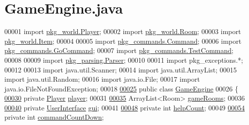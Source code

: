\hypertarget{GameEngine_8java_source}{\section{Game\-Engine.\-java}
}

\begin{DoxyCode}
00001 \textcolor{keyword}{import} \hyperlink{classpkg__world_1_1Player}{pkg\_world.Player};
00002 \textcolor{keyword}{import} \hyperlink{classpkg__world_1_1Room}{pkg\_world.Room};
00003 \textcolor{keyword}{import} \hyperlink{classpkg__world_1_1Item}{pkg\_world.Item};
00004 
00005 \textcolor{keyword}{import} \hyperlink{classpkg__commands_1_1Command}{pkg\_commands.Command};
00006 \textcolor{keyword}{import} \hyperlink{classpkg__commands_1_1GoCommand}{pkg\_commands.GoCommand};
00007 \textcolor{keyword}{import} \hyperlink{classpkg__commands_1_1TestCommand}{pkg\_commands.TestCommand};
00008 
00009 \textcolor{keyword}{import} \hyperlink{classpkg__parsing_1_1Parser}{pkg\_parsing.Parser};
00010 
00011 \textcolor{keyword}{import} pkg\_exceptions.*;
00012 
00013 \textcolor{keyword}{import} java.util.Scanner;
00014 \textcolor{keyword}{import} java.util.ArrayList;
00015 \textcolor{keyword}{import} java.util.Random;
00016 \textcolor{keyword}{import} java.io.File;
00017 \textcolor{keyword}{import} java.io.FileNotFoundException;
00018 
\hypertarget{GameEngine_8java_source_l00025}{}\hyperlink{classGameEngine}{00025} \textcolor{keyword}{public} \textcolor{keyword}{class }\hyperlink{classGameEngine}{GameEngine}
00026 \{
\hypertarget{GameEngine_8java_source_l00030}{}\hyperlink{classGameEngine_a4666c6719428cc43014b30b305eeef5d}{00030}     \textcolor{keyword}{private} \hyperlink{classpkg__world_1_1Player}{Player} \hyperlink{classGameEngine_a4666c6719428cc43014b30b305eeef5d}{player};
00031 
\hypertarget{GameEngine_8java_source_l00035}{}\hyperlink{classGameEngine_ae5a2f252ec103e0630aebb8635341ea4}{00035}     ArrayList<Room> \hyperlink{classGameEngine_ae5a2f252ec103e0630aebb8635341ea4}{gameRooms};
00036 
\hypertarget{GameEngine_8java_source_l00040}{}\hyperlink{classGameEngine_a2a7d0bb6183b3f3ef3ee2008926374a0}{00040}     \textcolor{keyword}{private} \hyperlink{classUserInterface}{UserInterface} \hyperlink{classGameEngine_a2a7d0bb6183b3f3ef3ee2008926374a0}{gui};
00041 
\hypertarget{GameEngine_8java_source_l00048}{}\hyperlink{classGameEngine_a308a9926d553d53cb4c56c28588f6c62}{00048}     \textcolor{keyword}{private} \textcolor{keywordtype}{int} \hyperlink{classGameEngine_a308a9926d553d53cb4c56c28588f6c62}{helpCount};
00049 
\hypertarget{GameEngine_8java_source_l00054}{}\hyperlink{classGameEngine_ad4ff8d760eced9c7b76cdeb0dc989975}{00054}     \textcolor{keyword}{private} \textcolor{keywordtype}{int} \hyperlink{classGameEngine_ad4ff8d760eced9c7b76cdeb0dc989975}{commandCountDown};

\end{DoxyCode}
